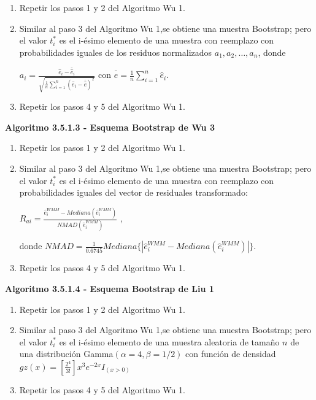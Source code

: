 \begin{enumerate}
	\item Repetir los pasos 1 y 2 del Algoritmo Wu 1.
	
	\item  Similar al paso 3 del Algoritmo Wu 1,se obtiene una muestra Bootstrap;
	pero el valor $t^{*}_{i}$ es el i-ésimo elemento de una muestra con reemplazo con probabilidades iguales de los residuos normalizados $a_{1},a_{2}, \dots,a_{n}$, donde
	
	\begin{center}
		{\Large $a_{i} = \frac{\hat{e}_{i}-\bar{\hat{ e}}_{i}}{ \sqrt{ \frac{1}{n} \sum_{i=1}^{n} (\hat{e}_{i}-\bar{\hat{e}})^{2} } }$} con {\large $ \bar{\hat{e}}= \frac{1}{n} \sum_{i=1}^{n} \hat{e}_{i} $}.
	\end{center}
	
	\item Repetir los pasos 4 y 5 del Algoritmo Wu 1.
\end{enumerate}



\textbf{Algoritmo 3.5.1.3 - Esquema Bootstrap de Wu 3}

\begin{enumerate}
	\item Repetir los pasos 1 y 2 del Algoritmo Wu 1.
	
	\item  Similar al paso 3 del Algoritmo Wu 1,se obtiene una muestra Bootstrap;
	pero el valor $t^{*}_{i}$ es el i-ésimo elemento de una muestra con reemplazo con probabilidades iguales del vector de residuales transformado:
	
	\begin{center}
		{\large $R_{ai} = \frac{\hat{e}^{WMM}_{i} - Mediana(\hat{e}^{WMM}_{i})}{ NMAD(\hat{e}^{WMM}_{i})  }$} ,
	\end{center}
	donde $NMAD = \frac{1}{0.6745} Mediana\{ | \hat{e}^{WMM}_{i} - Mediana(\hat{e}^{WMM}_{i}) | \}$.
	
	\item Repetir los pasos 4 y 5 del Algoritmo Wu 1.
\end{enumerate}


\textbf{Algoritmo 3.5.1.4 - Esquema Bootstrap de Liu 1}

\begin{enumerate}
	\item Repetir los pasos 1 y 2 del Algoritmo Wu 1.
	
	\item  Similar al paso 3 del Algoritmo Wu 1,se obtiene una muestra Bootstrap;
	pero el valor $t^{*}_{i}$ es el i-ésimo elemento de una muestra aleatoria de tamaño $n$ de una distribución Gamma$(\alpha = 4,\beta = 1/2)$ con función de densidad $ gz(x) = [\frac{2^{4}}{3!}]x^{3}e^{-2x}I_{(x>0)}$ 

	
	\item Repetir los pasos 4 y 5 del Algoritmo Wu 1.
\end{enumerate}



